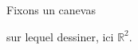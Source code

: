 \documentclass[preview]{standalone}
\begin{document}
\begin{center}
Fixons un canevas 
        
sur lequel dessiner, ici $\mathbb{R}^2$.
\end{center}
\end{document}
